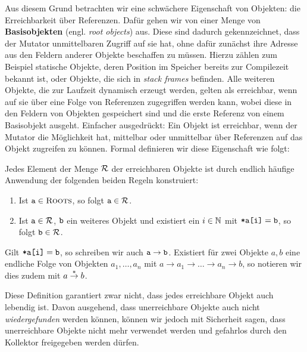 Aus diesem Grund betrachten wir eine schwächere Eigenschaft von Objekten: die Erreichbarkeit über Referenzen.
Dafür gehen wir von einer Menge \Roots von \textbf{Basisobjekten} (engl. \textit{root objects}) aus.
Diese sind dadurch gekennzeichnet, dass der Mutator unmittelbaren Zugriff auf sie hat, ohne dafür zunächst ihre Adresse aus den Feldern anderer Objekte beschaffen zu müssen.
Hierzu zählen zum Beispiel statische Objekte, deren Position im Speicher bereits zur Compilezeit bekannt ist, oder Objekte, die sich in \textit{stack frames} befinden.
Alle weiteren Objekte, die zur Laufzeit dynamisch erzeugt werden, gelten als erreichbar, wenn auf sie über eine Folge von Referenzen zugegriffen werden kann, wobei diese in den Feldern von Objekten gespeichert sind und die erste Referenz von einem Basisobjekt ausgeht.
Einfacher ausgedrückt: Ein Objekt ist erreichbar, wenn der Mutator die Möglichkeit hat, mittelbar oder unmittelbar über Referenzen auf das Objekt zugreifen zu können.
Formal definieren wir diese Eigenschaft wie folgt:

\begin{mybox}
\begin{defn}[Erreichbarkeit]
	\label{def:erreichbar}
	Jedes Element der Menge $\mathcal{R}$ der erreichbaren Objekte ist durch endlich häufige Anwendung der folgenden beiden Regeln konstruiert:
	\begin{enumerate}[(1)]
		\item Ist $\texttt{a} \in \textsc{Roots}$, so folgt $\texttt{a} \in \mathcal{R}$.
		\item Ist $\texttt{a} \in \mathcal{R}$, $\texttt{b}$ ein weiteres Objekt und existiert ein $i \in \mathbb{N}$ mit $\texttt{*a[i]} = \texttt{b}$, so folgt $\texttt{b} \in \mathcal{R}$.
	\end{enumerate}
	Gilt $\texttt{*a[i]} = \texttt{b}$, so schreiben wir auch $\texttt{a} \rightarrow \texttt{b}$.
	Existiert für zwei Objekte $a,b$ eine endliche Folge von Objekten $a_1, \dots, a_n$ mit $a \rightarrow a_1 \rightarrow \dots \rightarrow a_n \rightarrow b$, so notieren wir dies zudem mit $a \overset{*}{\rightarrow} b$.
\end{defn}
\end{mybox}

Diese Definition garantiert zwar nicht, dass jedes erreichbare Objekt auch lebendig ist.
Davon ausgehend, dass unerreichbare Objekte auch nicht \textit{wiedergefunden} werden können, können wir jedoch mit Sicherheit sagen, dass unerreichbare Objekte nicht mehr verwendet werden und gefahrlos durch den Kollektor freigegeben werden dürfen.

